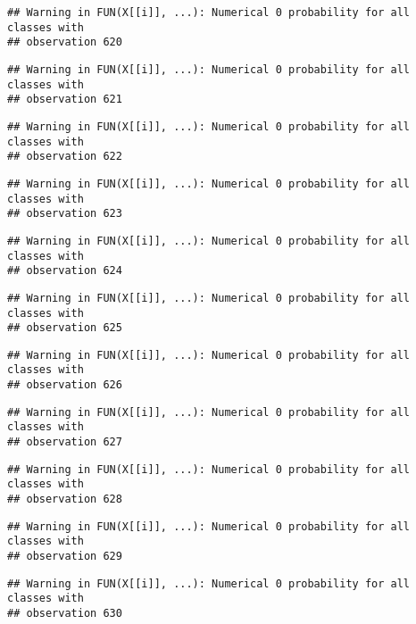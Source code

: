 \documentclass[
]{article}
\begin{document}
\begin{verbatim}
## Warning in FUN(X[[i]], ...): Numerical 0 probability for all classes with
## observation 620
\end{verbatim}

\begin{verbatim}
## Warning in FUN(X[[i]], ...): Numerical 0 probability for all classes with
## observation 621
\end{verbatim}

\begin{verbatim}
## Warning in FUN(X[[i]], ...): Numerical 0 probability for all classes with
## observation 622
\end{verbatim}

\begin{verbatim}
## Warning in FUN(X[[i]], ...): Numerical 0 probability for all classes with
## observation 623
\end{verbatim}

\begin{verbatim}
## Warning in FUN(X[[i]], ...): Numerical 0 probability for all classes with
## observation 624
\end{verbatim}

\begin{verbatim}
## Warning in FUN(X[[i]], ...): Numerical 0 probability for all classes with
## observation 625
\end{verbatim}

\begin{verbatim}
## Warning in FUN(X[[i]], ...): Numerical 0 probability for all classes with
## observation 626
\end{verbatim}

\begin{verbatim}
## Warning in FUN(X[[i]], ...): Numerical 0 probability for all classes with
## observation 627
\end{verbatim}

\begin{verbatim}
## Warning in FUN(X[[i]], ...): Numerical 0 probability for all classes with
## observation 628
\end{verbatim}

\begin{verbatim}
## Warning in FUN(X[[i]], ...): Numerical 0 probability for all classes with
## observation 629
\end{verbatim}

\begin{verbatim}
## Warning in FUN(X[[i]], ...): Numerical 0 probability for all classes with
## observation 630
\end{verbatim}
\end{document}
